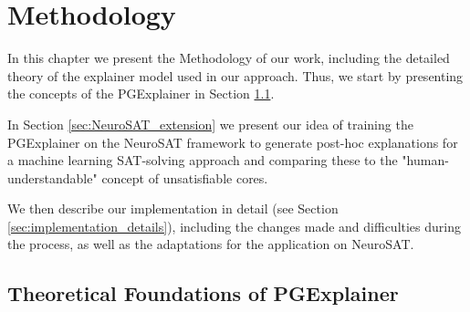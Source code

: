 \chapter{Methodology}
\label{ch:PGExplainer}


In this chapter we present the Methodology of our work, including the detailed theory of the explainer model used in our approach. Thus, we start by presenting the concepts of the PGExplainer \cite{luo2020parameterized} in Section \ref{sec:TheoryPGE}.

In Section \ref{sec:NeuroSAT_extension} we present our idea of training the PGExplainer on the NeuroSAT framework to generate post-hoc explanations for a machine learning SAT-solving approach and comparing these to the "human-understandable" concept of unsatisfiable cores. 

We then describe our implementation in detail (see Section \ref{sec:implementation_details}), including the changes made and difficulties during the process, as well as the adaptations for the application on NeuroSAT.

\section{Theoretical Foundations of PGExplainer}
\label{sec:TheoryPGE}


